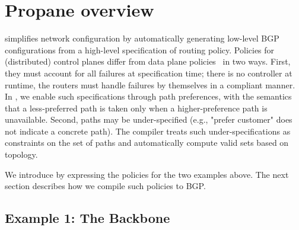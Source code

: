 \section{Propane overview}
\label{sec:propane}

\sysname simplifies network configuration by automatically generating low-level BGP configurations from a high-level specification of routing policy.
%
Policies for (distributed) control planes differ from data plane policies~\cite{x,y,z} in two ways. First, they must account for all failures at specification time; there is no controller at runtime, the routers must handle failures by themselves in a compliant manner.
%
In \sysname, we enable such specifications through path preferences, with the semantics that a less-preferred path is taken only when a higher-preference path is unavailable.
%
Second, paths may be under-specified (e.g., "prefer customer" does not indicate a concrete path). The \sysname compiler treats such under-specifications as constraints on the set of paths and automatically compute valid sets based on topology.




We introduce \sysname by expressing the policies for the two examples above.
%
The next section describes how we compile such policies to BGP.

\subsection{Example 1: The Backbone}


